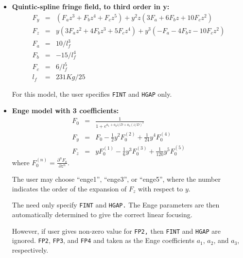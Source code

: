 \begin{itemize}
\item {\bf Quintic-spline fringe field, to third order in y:}
\begin{eqnarray}
F_y & = &    (F_a z^3 + F_b z^4 + F_c z^5) +
             y^2 z (3 F_a + 6 F_b z + 10 F_c z^2) \\
F_z & = &  y   (3 F_a z^2 + 4 F_b z^3 + 5 F_c z^4) +
             y^3 (-F_a - 4 F_b z - 10 F_c z^2) \\
F_a & = &  10/l_f^3 \\
F_b & = & -15/l_f^4 \\
F_c & = & 6/l_f^5 \\
l_f & = & 231 K g /25
\end{eqnarray}

For this model, the user specifies {\tt FINT} and {\tt HGAP} only.

\item {\bf Enge model with 3 coefficients:}
\begin{eqnarray}
F_0 & = & \frac{1}{1 + e^{a_1 + a_2 z/D + a_3 (z/D)^2}} \\
F_y & = &  F_0 - \frac{1}{2} y^2 F_0^{(2)} + \frac{1}{24} y^4 F_0^{(4)} \\
F_z & = &  y F_0^{(1)} - \frac{1}{6} y^3 F_0^{(3)} + \frac{1}{120} y^5 F_0^{(5)}
\end{eqnarray}
where $F_0^{(n)} = \frac{\partial^n F_0}{\partial z^n}$.

The user may choose ``enge1'', ``enge3'', or ``enge5'', where the number indicates the order of the
expansion of $F_z$ with respect to $y$.  

The need only specify {\tt FINT} and {\tt HGAP.}  The Enge parameters are then automatically determined to
give the correct linear focusing.

However, if user gives non-zero value for {\tt FP2,} then {\tt FINT} and {\tt HGAP} are ignored.
{\tt FP2}, {\tt FP3}, and {\tt FP4} and taken as the Enge coefficients $a_1$, $a_2$, and $a_3$,
respectively.
 
\end{itemize}
